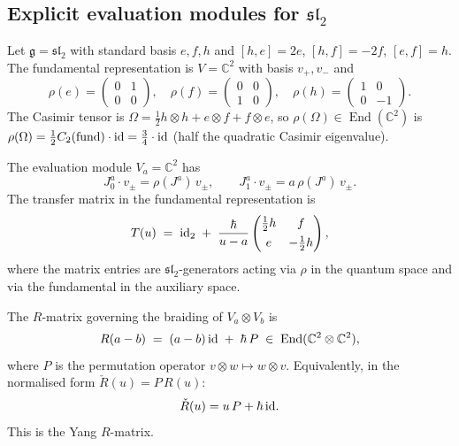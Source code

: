 \subsection{Explicit evaluation modules for $\mathfrak{sl}_2$}

\begin{computation}
\label{comp:sl2-eval}
Let $\mathfrak{g}=\mathfrak{sl}_2$ with standard basis
$e,f,h$ and $[h,e]=2e$, $[h,f]=-2f$, $[e,f]=h$.
The fundamental representation is $V=\mathbb{C}^2$ with
basis $v_+,v_-$ and
\[
\rho(e)=\begin{pmatrix}0&1\\0&0\end{pmatrix},
\quad
\rho(f)=\begin{pmatrix}0&0\\1&0\end{pmatrix},
\quad
\rho(h)=\begin{pmatrix}1&0\\0&-1\end{pmatrix}.
\]
The Casimir tensor is
$\Omega=\tfrac{1}{2}h\otimes h+e\otimes f+f\otimes e$,
so $\rho(\Omega)\in\operatorname{End}(\mathbb{C}^2)$
is $\rho(\Omega)=\tfrac{1}{2}C_2(\mathrm{fund})\cdot\mathrm{id}
=\tfrac{3}{4}\cdot\mathrm{id}$ (half the quadratic Casimir eigenvalue).

The evaluation module $V_a=\mathbb{C}^2$ has
\[
J^a_0\cdot v_\pm=\rho(J^a)\,v_\pm,
\qquad
J^a_1\cdot v_\pm=a\,\rho(J^a)\,v_\pm.
\]
The transfer matrix in the fundamental representation is
\begin{equation}\label{eq:sl2-transfer-fundamental}
T(u)
\;=\;
\mathrm{id}_2
\;+\;
\frac{\hbar}{u-a}
\begin{pmatrix}
\tfrac{1}{2}h & f \\[4pt]
e & -\tfrac{1}{2}h
\end{pmatrix},
\end{equation}
where the matrix entries are $\mathfrak{sl}_2$-generators
acting via $\rho$ in the quantum space and via the
fundamental in the auxiliary space.
\end{computation}

\begin{theorem}
\label{thm:sl2-R-matrix}
The $R$-matrix governing the braiding of
$V_a\otimes V_b$ is
\begin{equation}\label{eq:sl2-R-eval}
R(a-b)
\;=\;
(a-b)\,\mathrm{id}\;+\;\hbar\,P
\;\in\;
\operatorname{End}(\mathbb{C}^2\otimes\mathbb{C}^2),
\end{equation}
where $P$ is the permutation operator $v\otimes w\mapsto w\otimes v$.
Equivalently, in the normalised form $\check{R}(u)=P\,R(u)$:
\[
\check{R}(u)
=
u\,P+\hbar\,\mathrm{id}.
\]
This is the Yang $R$-matrix.
\end{theorem}

